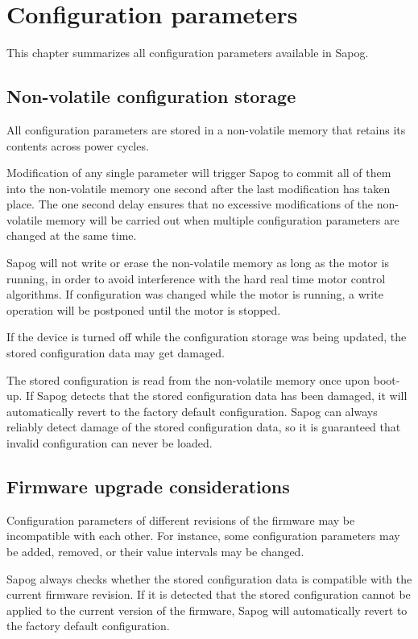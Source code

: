 \documentclass{zubaxdoc}
\begin{document}
\chapter{Configuration parameters}

This chapter summarizes all configuration parameters available in Sapog.

\section{Non-volatile configuration storage}

All configuration parameters are stored in a non-volatile memory
that retains its contents across power cycles.

Modification of any single parameter will trigger Sapog to commit all of them into the non-volatile
memory one second after the last modification has taken place.
The one second delay ensures that no excessive modifications of the non-volatile memory will be carried out
when multiple configuration parameters are changed at the same time.

Sapog will not write or erase the non-volatile memory as long as the motor is running, in order to
avoid interference with the hard real time motor control algorithms.
If configuration was changed while the motor is running,
a write operation will be postponed until the motor is stopped.

If the device is turned off while the configuration storage was being updated,
the stored configuration data may get damaged.

The stored configuration is read from the non-volatile memory once upon boot-up.
If Sapog detects that the stored configuration data has been damaged,
it will automatically revert to the factory default configuration.
Sapog can always reliably detect damage of the stored configuration data,
so it is guaranteed that invalid configuration can never be loaded.

\section{Firmware upgrade considerations}

Configuration parameters of different revisions of the firmware may be incompatible with each other.
For instance, some configuration parameters may be added, removed, or their value intervals may be changed.

Sapog always checks whether the stored configuration data is compatible with the current firmware revision.
If it is detected that the stored configuration cannot be applied to the current version of the firmware,
Sapog will automatically revert to the factory default configuration.
\end{document}
